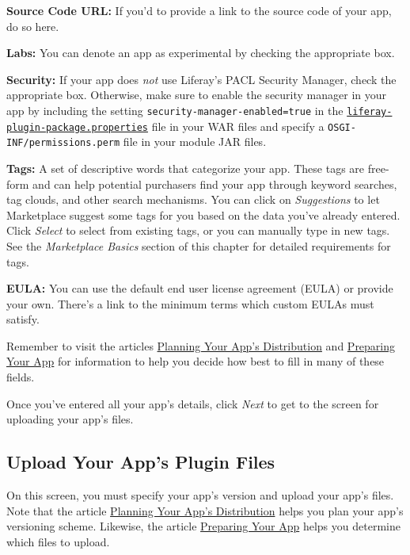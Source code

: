 \textbf{Source Code URL:} If you'd to provide a link to the source code
of your app, do so here.

\textbf{Labs:} You can denote an app as experimental by checking the
appropriate box.

\textbf{Security:} If your app does \emph{not} use Liferay's PACL
Security Manager, check the appropriate box. Otherwise, make sure to
enable the security manager in your app by including the setting
\texttt{security-manager-enabled=true} in the
\href{http://docs.liferay.com/portal/6.2/propertiesdoc/liferay-plugin-package_6_2_0.properties.html}{\texttt{liferay-plugin-package.properties}}
file in your WAR files and specify a \texttt{OSGI-INF/permissions.perm}
file in your module JAR files.

\textbf{Tags:} A set of descriptive words that categorize your app.
These tags are free-form and can help potential purchasers find your app
through keyword searches, tag clouds, and other search mechanisms. You
can click on \emph{Suggestions} to let Marketplace suggest some tags for
you based on the data you've already entered. Click \emph{Select} to
select from existing tags, or you can manually type in new tags. See the
\emph{Marketplace Basics} section of this chapter for detailed
requirements for tags.

\textbf{EULA:} You can use the default end user license agreement (EULA)
or provide your own. There's a link to the minimum terms which custom
EULAs must satisfy.

Remember to visit the articles
\href{/distribute/how-to-publish/-/knowledge_base/how-to-publish/planning-your-apps-distribution}{Planning
Your App's Distribution} and
\href{/distribute/how-to-publish/-/knowledge_base/how-to-publish/preparing-your-app}{Preparing
Your App} for information to help you decide how best to fill in many of
these fields.

Once you've entered all your app's details, click \emph{Next} to get to
the screen for uploading your app's files.

\subsection{Upload Your App's Plugin
Files}\label{upload-your-apps-plugin-files}

On this screen, you must specify your app's version and upload your
app's files. Note that the article
\href{/distribute/how-to-publish/-/knowledge_base/how-to-publish/planning-your-apps-distribution}{Planning
Your App's Distribution} helps you plan your app's versioning scheme.
Likewise, the article
\href{/distribute/how-to-publish/-/knowledge_base/how-to-publish/preparing-your-app}{Preparing
Your App} helps you determine which files to upload.

